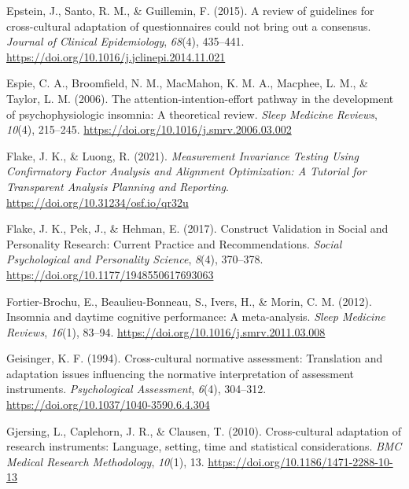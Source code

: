 \documentclass[
  ,doc,11pt, twoside,floatsintext]{apa6}
\newlength{\cslhangindent}
\newlength{\cslentryspacingunit} %
\newenvironment{CSLReferences}[2] %
 {%
  \setlength{\parindent}{0pt}
  \ifodd #1
  \let\oldpar\par
  \def\par{\hangindent=\cslhangindent\oldpar}
  \fi
  \setlength{\parskip}{#2\cslentryspacingunit}
 }%
 {}
\begin{document}
\begin{CSLReferences}{1}{0}
\leavevmode{}%
Epstein, J., Santo, R. M., \& Guillemin, F. (2015). A review of guidelines for cross-cultural adaptation of questionnaires could not bring out a consensus. \emph{Journal of Clinical Epidemiology}, \emph{68}(4), 435--441. \url{https://doi.org/10.1016/j.jclinepi.2014.11.021}

\leavevmode{}%
Espie, C. A., Broomfield, N. M., MacMahon, K. M. A., Macphee, L. M., \& Taylor, L. M. (2006). The attention-intention-effort pathway in the development of psychophysiologic insomnia: A theoretical review. \emph{Sleep Medicine Reviews}, \emph{10}(4), 215--245. \url{https://doi.org/10.1016/j.smrv.2006.03.002}

\leavevmode{}%
Flake, J. K., \& Luong, R. (2021). \emph{Measurement {Invariance Testing Using Confirmatory Factor Analysis} and {Alignment Optimization}: {A Tutorial} for {Transparent Analysis Planning} and {Reporting}}. \url{https://doi.org/10.31234/osf.io/qr32u}

\leavevmode{}%
Flake, J. K., Pek, J., \& Hehman, E. (2017). Construct {Validation} in {Social} and {Personality Research}: {Current Practice} and {Recommendations}. \emph{Social Psychological and Personality Science}, \emph{8}(4), 370--378. \url{https://doi.org/10.1177/1948550617693063}

\leavevmode{}%
Fortier-Brochu, E., Beaulieu-Bonneau, S., Ivers, H., \& Morin, C. M. (2012). Insomnia and daytime cognitive performance: A meta-analysis. \emph{Sleep Medicine Reviews}, \emph{16}(1), 83--94. \url{https://doi.org/10.1016/j.smrv.2011.03.008}

\leavevmode{}%
Geisinger, K. F. (1994). Cross-cultural normative assessment: {Translation} and adaptation issues influencing the normative interpretation of assessment instruments. \emph{Psychological Assessment}, \emph{6}(4), 304--312. \url{https://doi.org/10.1037/1040-3590.6.4.304}

\leavevmode{}%
Gjersing, L., Caplehorn, J. R., \& Clausen, T. (2010). Cross-cultural adaptation of research instruments: Language, setting, time and statistical considerations. \emph{BMC Medical Research Methodology}, \emph{10}(1), 13. \url{https://doi.org/10.1186/1471-2288-10-13}


\end{CSLReferences}
\end{document}
